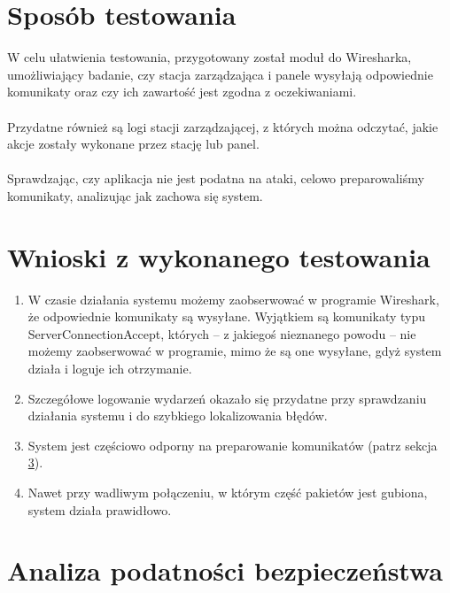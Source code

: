 \documentclass[12pt, a4paper]{article}
\begin{document}
\hypertarget{sposuxf3b-testowania}{%
\section{Sposób testowania}\label{sposuxf3b-testowania}}

W celu ułatwienia testowania, przygotowany został moduł do Wiresharka, 
umożliwiający badanie, czy stacja zarządzająca i panele wysyłają
odpowiednie komunikaty oraz czy ich zawartość jest zgodna z
oczekiwaniami.
\\
\\
Przydatne również są logi stacji zarządzającej, z których
można odczytać, jakie akcje zostały wykonane przez stację lub panel.
\\
\\
Sprawdzając, czy aplikacja nie jest podatna na ataki, celowo preparowaliśmy komunikaty, analizując jak zachowa się system.

\hypertarget{wnioski-z-testowania}{%
\section{Wnioski z wykonanego testowania}\label{wnioski-z-testowania}}

\begin{enumerate}
    \item W czasie działania systemu możemy zaobserwować w programie Wireshark, że odpowiednie komunikaty są wysyłane. Wyjątkiem są komunikaty typu ServerConnectionAccept, których -- z jakiegoś nieznanego powodu -- nie możemy zaobserwować w programie, mimo że są one wysyłane, gdyż system działa i loguje ich otrzymanie.
    \item Szczegółowe logowanie wydarzeń okazało się przydatne przy sprawdzaniu działania systemu i do szybkiego lokalizowania błędów.
    \item System jest częściowo odporny na preparowanie komunikatów (patrz sekcja \ref{bezpieczenstwo}).
    \item Nawet przy wadliwym połączeniu, w którym część pakietów jest gubiona, system działa prawidłowo. 
\end{enumerate}

\hypertarget{bezpieczenstwo}{%
\section{Analiza podatności bezpieczeństwa}\label{bezpieczenstwo}}
\end{document}
